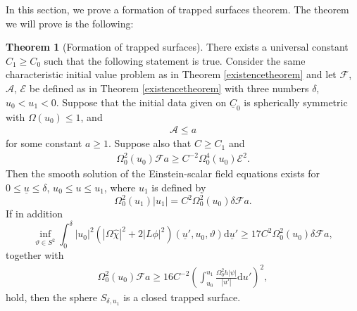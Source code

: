 \documentclass[11pt,reqno]{amsart}
\theoremstyle{definition}
\newtheorem{theorem}{Theorem}[section]
\numberwithin{equation}{section}
\newcommand{\D}{\mathrm{d}}
\def\chih{\widehat{\chi}}
\def\ub{\underline{u}}
\def\Cb{\underline{C}}
\begin{document}
In this section, we prove a formation of trapped surfaces theorem. The theorem we will prove is the following:
\begin{theorem}[Formation of trapped surfaces]\label{formationoftrappedsurfaces}
There exists a universal constant $C_1\ge C_0$ such that the following statement is true. Consider the same characteristic initial value problem as in Theorem \ref{existencetheorem} and let $\mathscr{F}$, $\mathcal{A}$, $\mathscr{E}$ be defined as in Theorem \ref{existencetheorem} with three numbers $\delta$, $u_0<u_1<0$. Suppose that the initial data given on $\Cb_0$ is spherically symmetric with $\Omega(u_0)\le1$, and\begin{align}\label{condition-CA}
\mathcal{A}\le a
\end{align}
for some constant $a\ge1$. Suppose also that $C\ge C_1$ and
\begin{align}\label{conditionexistence}\Omega_0^2(u_0)\mathscr{F}a\ge C^{-2}\Omega_0^4(u_0)\mathscr{E}^2.\end{align}
Then the smooth solution of the Einstein-scalar field equations exists for $0\le \ub\le\delta$, $u_0\le u\le u_1$, where $u_1$ is defined by
\begin{equation}\label{def-u1}
\Omega^2_0(u_1)|u_1|=C^2\Omega_0^2(u_0)\delta\mathscr{F}a.
\end{equation}
If in addition 
\begin{equation}\label{conditiontrapped}
\inf_{\vartheta\in S^2}\int_0^{\delta}|u_0|^2(|\Omega\chih|^2+2|L\phi|^2)(\ub',u_0,\vartheta)\D\ub'\ge  17C^2\Omega_0^2(u_0)\delta\mathscr{F}a,
\end{equation}
together with
\begin{align}\label{conditiontrapped1}
\Omega_0^2(u_0)\mathscr{F}a\ge 16C^{-2}\left(\int_{u_0}^{u_1}\frac{\Omega_0^2h|\psi|}{|u'|}\D u'\right)^{2},
\end{align}
hold, then the sphere $S_{\delta,u_1}$ is a closed trapped surface.
\end{theorem}
\end{document}
